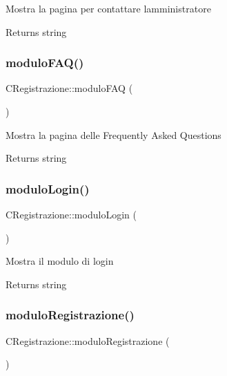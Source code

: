 Mostra la pagina per contattare l\textquotesingle{}amministratore

\begin{DoxyReturn}{Returns}
string 
\end{DoxyReturn}
\mbox{\label{class_c_registrazione_a45538c1ae0a7b43b28341e95bdf2fea1}} 
\subsubsection{\texorpdfstring{modulo\+F\+A\+Q()}{moduloFAQ()}}
{\footnotesize\ttfamily C\+Registrazione\+::modulo\+F\+AQ (\begin{DoxyParamCaption}{ }\end{DoxyParamCaption})}

Mostra la pagina delle Frequently Asked Questions

\begin{DoxyReturn}{Returns}
string 
\end{DoxyReturn}
\mbox{\label{class_c_registrazione_a16420af27b3863dacf52df64aa28b59f}} 
\subsubsection{\texorpdfstring{modulo\+Login()}{moduloLogin()}}
{\footnotesize\ttfamily C\+Registrazione\+::modulo\+Login (\begin{DoxyParamCaption}{ }\end{DoxyParamCaption})}

Mostra il modulo di login

\begin{DoxyReturn}{Returns}
string 
\end{DoxyReturn}
\mbox{\label{class_c_registrazione_a95fb25c8c8477504e3bb4f684691a31c}} 
\subsubsection{\texorpdfstring{modulo\+Registrazione()}{moduloRegistrazione()}}
{\footnotesize\ttfamily C\+Registrazione\+::modulo\+Registrazione (\begin{DoxyParamCaption}{ }\end{DoxyParamCaption})}


